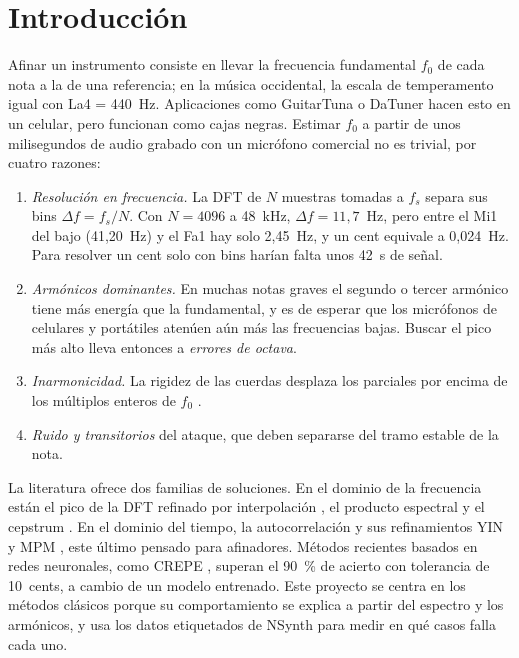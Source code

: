 \documentclass[conference,a4paper]{IEEEtran}
\newcommand{\fo}{f_0}
\begin{document}
\section{Introducción}
Afinar un instrumento consiste en llevar la frecuencia fundamental $\fo$ de cada nota a la de una referencia; en la música occidental, la escala de temperamento igual con La4 = 440~Hz. Aplicaciones como GuitarTuna o DaTuner hacen esto en un celular, pero funcionan como cajas negras. Estimar $\fo$ a partir de unos milisegundos de audio grabado con un micrófono comercial no es trivial, por cuatro razones:
\begin{enumerate}
\item \emph{Resolución en frecuencia.} La DFT de $N$ muestras tomadas a $f_s$ separa sus bins $\Delta f = f_s/N$. Con $N=4096$ a 48~kHz, $\Delta f = 11{,}7$~Hz, pero entre el Mi1 del bajo (41,20~Hz) y el Fa1 hay solo 2,45~Hz, y un cent equivale a 0,024~Hz. Para resolver un cent solo con bins harían falta unos 42~s de señal.
\item \emph{Armónicos dominantes.} En muchas notas graves el segundo o tercer armónico tiene más energía que la fundamental, y es de esperar que los micrófonos de celulares y portátiles atenúen aún más las frecuencias bajas. Buscar el pico más alto lleva entonces a \emph{errores de octava}.
\item \emph{Inarmonicidad.} La rigidez de las cuerdas desplaza los parciales por encima de los múltiplos enteros de $\fo$ \parencite{fletcher1998physics}.
\item \emph{Ruido y transitorios} del ataque, que deben separarse del tramo estable de la nota.
\end{enumerate}
La literatura ofrece dos familias de soluciones. En el dominio de la frecuencia están el pico de la DFT refinado por interpolación \parencite{jacobsen2007fast}, el producto espectral \parencite{schroeder1968period,noll1970hps} y el cepstrum \parencite{noll1967cepstrum}. En el dominio del tiempo, la autocorrelación \parencite{rabiner1977autocorrelation} y sus refinamientos YIN \parencite{decheveigne2002yin} y MPM \parencite{mcleod2005smarter}, este último pensado para afinadores. Métodos recientes basados en redes neuronales, como CREPE \parencite{kim2018crepe}, superan el 90~\% de acierto con tolerancia de 10~cents, a cambio de un modelo entrenado. Este proyecto se centra en los métodos clásicos porque su comportamiento se explica a partir del espectro y los armónicos, y usa los datos etiquetados de NSynth \parencite{engel2017nsynth} para medir en qué casos falla cada uno.
\end{document}
